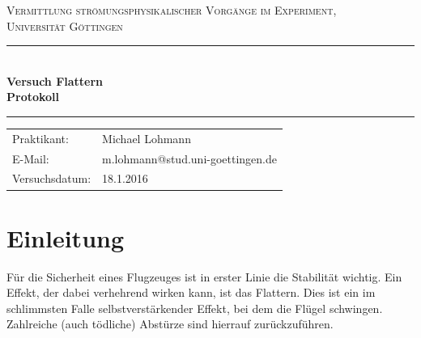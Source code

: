 \documentclass[12pt,a4paper,titlepage,headinclude,bibtotoc]{scrartcl}
\begin{document}
\begin{titlepage}
\centering
\textsc{\Large Vermittlung strömungsphysikalischer Vorgänge im Experiment,
\\[1.5ex] Universität Göttingen}

\vspace*{3cm}

\rule{\textwidth}{1pt}\\[0.5cm]
{\huge \bfseries
  Versuch Flattern  \\[1.5ex]
  Protokoll}\\[0.5cm]
\rule{\textwidth}{1pt}

\vspace*{3cm}

\begin{Large}
\begin{tabular}{ll}
Praktikant: &  Michael Lohmann\\
 E-Mail: & m.lohmann@stud.uni-goettingen.de\\
 Versuchsdatum: & 18.1.2016\\
\end{tabular}
\end{Large}

\vspace*{0.8cm}

\begin{Large}
\end{Large}

\end{titlepage}

\tableofcontents

\newpage

\section{Einleitung}
Für die Sicherheit eines Flugzeuges ist in erster Linie die Stabilität wichtig.
Ein Effekt, der dabei verhehrend wirken kann, ist das Flattern.
Dies ist ein im schlimmsten Falle selbstverstärkender Effekt, bei dem die Flügel schwingen.
Zahlreiche (auch tödliche) Abstürze sind hierrauf zurückzuführen.
\end{document}
